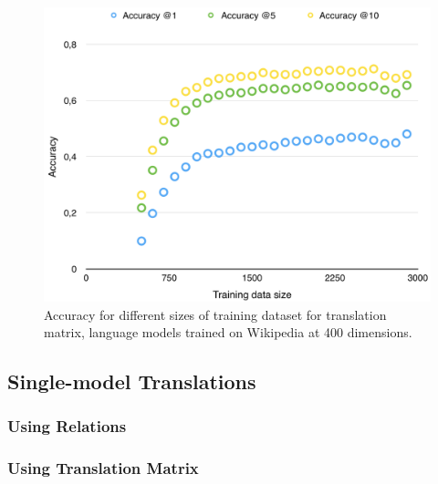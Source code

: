 \begin{figure}[ht!]
  \centering \includegraphics[width=\linewidth]{images/accuracy_nlwiki400_enwiki400_lowercase}
  \caption{Accuracy for different sizes of training dataset for translation matrix, language models trained on Wikipedia at 400 dimensions.}
  \label{fig:accuracy_nlwiki400_enwiki400_lowercase}
\end{figure}

\subsection{Single-model Translations}
\subsubsection{Using Relations}

\subsubsection{Using Translation Matrix}